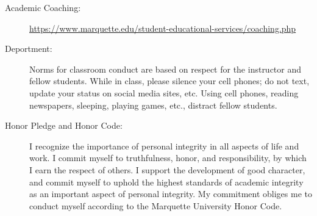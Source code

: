 \documentclass[10pt]{article}
\begin{document}
\begin{description}
\item[Academic Coaching:] \url{https://www.marquette.edu/student-educational-services/coaching.php}

\item[Deportment:] Norms for classroom conduct are based on respect for the instructor and fellow students. While in class, please silence your cell phones; do not text, update your status on social media sites, etc. Using cell phones, reading newspapers, sleeping, playing games, etc., distract fellow students.

\item[Honor Pledge and Honor Code:]  I recognize the importance of personal integrity in all aspects of life and work. I commit myself to truthfulness, honor, and responsibility, by which I earn the respect of others. I support the development of good character, and commit myself to uphold the highest standards of academic integrity as an important aspect of personal integrity. My commitment obliges me to conduct myself according to the Marquette University Honor Code.


\end{description}
\end{document}
